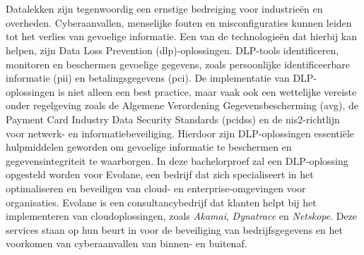 
\chapter{}%
\label{ch:inleiding}


Datalekken zijn tegenwoordig een ernstige bedreiging voor industrieën en overheden. 
Cyberaanvallen, menselijke fouten en misconfiguraties kunnen leiden tot het verlies van gevoelige informatie. 
Een van de technologieën dat hierbij kan helpen, zijn Data Loss Prevention (\gls{dlp})-oplossingen.
DLP-tools identificeren, monitoren en beschermen gevoelige gegevens, zoals persoonlijke identificeerbare informatie (\gls{pii}) en betalingsgegevens (\gls{pci}). 
De implementatie van DLP-oplossingen is niet alleen een best practice, maar vaak ook een wettelijke vereiste onder regelgeving zoals de 
Algemene Verordening Gegevensbescherming (\gls{avg}), de Payment Card Industry Data Security Standards (\gls{pcidss}) en de \gls{nis2}-richtlijn voor netwerk- en informatiebeveiliging.
Hierdoor zijn DLP-oplossingen essentiële hulpmiddelen geworden om gevoelige informatie te beschermen en gegevensintegriteit te waarborgen. 
In deze bachelorproef zal een DLP-oplossing opgesteld worden voor Evolane, een bedrijf dat zich specialiseert in het optimaliseren en beveiligen van cloud- en enterprise-omgevingen voor organisaties. 
Evolane is een consultancybedrijf dat klanten helpt bij het implementeren van cloudoplossingen, zoals \textit{Akamai}, \textit{Dynatrace} en \textit{Netskope}. 
Deze services staan op hun beurt in voor de beveiliging van bedrijfsgegevens en het voorkomen van cyberaanvallen van binnen- en buitenaf. 

